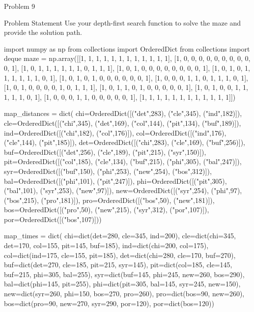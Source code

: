 \begin{problem}{Problem 9}
    \begin{statement}{Problem Statement}
        Use your depth-first search function to solve the maze and provide the solution path.
    \end{statement}

    \begin{highlight}[Solution]
    \begin{code}[Python]
    import numpy as np
    from collections import OrderedDict
    from collections import deque
    maze = np.array([[1, 1, 1, 1, 1, 1, 1, 1, 1, 1, 1, 1],
                    [1, 0, 0, 0, 0, 0, 0, 0, 0, 0, 0, 1],
                    [1, 0, 1, 1, 1, 1, 1, 1, 0, 1, 1, 1],
                    [1, 0, 1, 0, 0, 0, 0, 0, 0, 0, 0, 1],
                    [1, 0, 1, 0, 1, 1, 1, 1, 1, 1, 0, 1],
                    [1, 0, 1, 0, 1, 0, 0, 0, 0, 0, 0, 1],
                    [1, 0, 0, 0, 1, 1, 0, 1, 1, 1, 0, 1],
                    [1, 0, 1, 0, 0, 0, 0, 1, 0, 1, 1, 1],
                    [1, 0, 1, 1, 0, 1, 0, 0, 0, 0, 0, 1],
                    [1, 0, 1, 0, 0, 1, 1, 1, 1, 1, 0, 1],
                    [1, 0, 0, 0, 1, 1, 0, 0, 0, 0, 0, 1],
                    [1, 1, 1, 1, 1, 1, 1, 1, 1, 1, 1, 1]])
    
    map_distances = dict(
        chi=OrderedDict([("det",283), ("cle",345), ("ind",182)]),
        cle=OrderedDict([("chi",345), ("det",169), ("col",144), ("pit",134), ("buf",189)]),
        ind=OrderedDict([("chi",182), ("col",176)]),
        col=OrderedDict([("ind",176), ("cle",144), ("pit",185)]),
        det=OrderedDict([("chi",283), ("cle",169), ("buf",256)]),
        buf=OrderedDict([("det",256), ("cle",189), ("pit",215), ("syr",150)]),
        pit=OrderedDict([("col",185), ("cle",134), ("buf",215), ("phi",305), ("bal",247)]),
        syr=OrderedDict([("buf",150), ("phi",253), ("new",254), ("bos",312)]),
        bal=OrderedDict([("phi",101), ("pit",247)]),
        phi=OrderedDict([("pit",305), ("bal",101), ("syr",253), ("new",97)]),
        new=OrderedDict([("syr",254), ("phi",97), ("bos",215), ("pro",181)]),
        pro=OrderedDict([("bos",50), ("new",181)]),
        bos=OrderedDict([("pro",50), ("new",215), ("syr",312), ("por",107)]),
        por=OrderedDict([("bos",107)]))
    
    map_times = dict(
        chi=dict(det=280, cle=345, ind=200),
        cle=dict(chi=345, det=170, col=155, pit=145, buf=185),
        ind=dict(chi=200, col=175),
        col=dict(ind=175, cle=155, pit=185),
        det=dict(chi=280, cle=170, buf=270),
        buf=dict(det=270, cle=185, pit=215, syr=145),
        pit=dict(col=185, cle=145, buf=215, phi=305, bal=255),
        syr=dict(buf=145, phi=245, new=260, bos=290),
        bal=dict(phi=145, pit=255),
        phi=dict(pit=305, bal=145, syr=245, new=150),
        new=dict(syr=260, phi=150, bos=270, pro=260),
        pro=dict(bos=90, new=260),
        bos=dict(pro=90, new=270, syr=290, por=120),
        por=dict(bos=120))
    

\end{code}
\end{highlight}
\end{problem}
